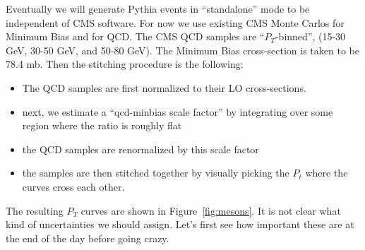 \documentclass[12pt]{article}
\begin{document}
Eventually we will generate Pythia events in ``standalone'' mode to
be independent of CMS software.  For now we use existing CMS Monte
Carlos
for Minimum Bias and for QCD.  The CMS QCD samples are
``$P_T$-binned'',
(15-30 GeV, 30-50 GeV, and 50-80 GeV).  The Minimum Bias 
cross-section 
is taken to be 78.4 mb.  Then the stitching procedure is the following:
\begin{itemize}
\item The QCD samples are first normalized to their LO cross-sections.
\item next, we estimate a ``qcd-minbias scale factor'' by integrating
  over some region where the ratio is roughly flat
\item the QCD samples are renormalized by this scale factor
\item the samples are then stitched together by visually picking the 
$P_t$ where the curves cross each other.
\end{itemize}
\noindent The resulting $P_T$ curves are shown in
Figure~\ref{fig:mesons}.  It is not clear what kind of uncertainties
we should assign.  Let's first see how important these are at the end
of the day before going crazy.
\end{document}
